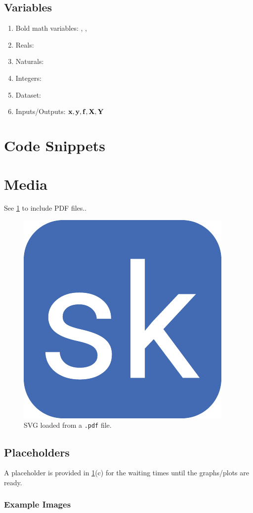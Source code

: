 \documentclass{article}
\begin{document}
\subsection{Variables}
\begin{enumerate}%
\item Bold math variables: \mbf{\Sigma}, ,
\item Reals: \reals
\item Naturals: \naturals
\item Integers: \ints
\item Dataset: \dset
\item Inputs/Outputs: ${\boldsymbol{\mathbf{x}}},{\boldsymbol{\mathbf{y}}},{\boldsymbol{\mathbf{f}}},{\boldsymbol{\mathbf{X}}},{\boldsymbol{\mathbf{Y}}}$
\end{enumerate}

\section{Code Snippets}



\section{Media}

See \cref{fig:svg_pdf} to include PDF files..

\begin{figure}[ht]
    \centering
	\includegraphics[width=0.15\linewidth]{favicon.pdf} 
    \caption{SVG loaded from a \texttt{.pdf} file.}
    \label{fig:svg_pdf}
\end{figure}    

\subsection{Placeholders}

A placeholder is provided in \cref{fig:svg_pdf}(c) for the waiting times until the graphs/plots are ready.

\subsubsection{Example Images}
\end{document}
